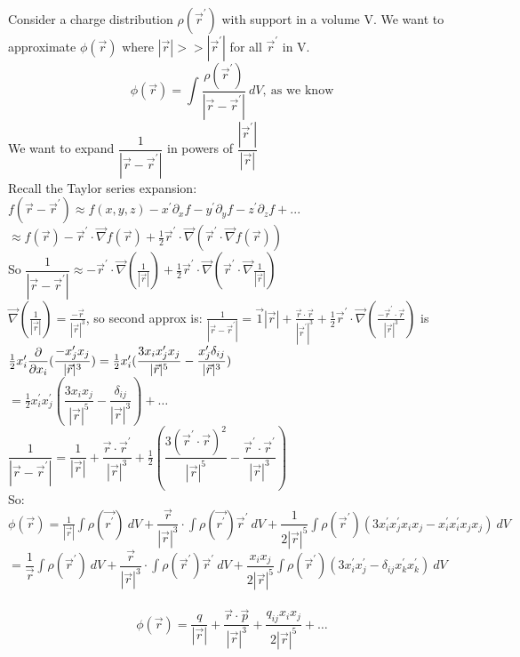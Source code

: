 Consider a charge distribution $\rho(\vec{r}^\prime)$ with support in a volume V. We want to approximate $\phi(\vec{r})$ where $|\vec{r}|>>|\vec{r}^\prime|$ for all $\vec{r}^\prime$ in V.
$$\phi(\vec{r})=\int \dfrac{\rho(\vec{r}^\prime)}{|\vec{r}-\vec{r}^\prime|}~dV,~\text{as we know}$$
We want to expand $\dfrac{1}{|\vec{r}-\vec{r}^\prime|}$ in powers of $\dfrac{|\vec{r}^\prime|}{|\vec{r}|}$\\
Recall the Taylor series expansion:\\
$f(\vec{r}-\vec{r}^\prime)\approx f(x,y,z)-x^\prime\partial_xf-y^\prime \partial_y f- z^\prime\partial_z f+...$\\
$\approx f(\vec{r}) -\vec{r}^\prime \cdot \vec{\nabla}f(\vec{r})+\frac{1}{2}\vec{r}^\prime \cdot \vec{\nabla}(\vec{r}^\prime \cdot \vec{\nabla} f(\vec{r}))$\\
So $\dfrac{1}{|\vec{r}-\vec{r}^\prime|} \approx -\vec{r}^\prime \cdot \vec{\nabla}(\frac{1}{|\vec{r}|}) + \frac{1}{2} \vec{r}^\prime \cdot \vec{\nabla}(\vec{r}^\prime\cdot \vec{\nabla}\frac{1}{|\vec{r}|})$\\
$\vec{\nabla}(\frac{1}{|\vec{r}|})=\frac{-\vec{r}}{|\vec{r}|^3}$, so second approx is:
$\frac{1}{|\vec{r}-\vec{r}^\prime|}=\vec{1}{|\vec{r}|}+\frac{\vec{r}\cdot\vec{r}}{|\vec{r}^\prime|^3}+\frac{1}{2}\vec{r}^\prime\cdot\vec{\nabla}(\frac{-\vec{r}^\prime \cdot \vec{r}}{|\vec{r}|^3})$ is \\
$\frac{1}{2} x^\prime _i \dfrac{\partial }{\partial x_i}(\dfrac{-x^\prime _j x_j}{|\vec{r}|^3})=\frac{1}{2} x^\prime _i (\dfrac{3x_i x_j ^\prime x_j}{|\vec{r}|^5} - \dfrac{x^\prime _j \delta_{ij}}{|\vec{r}|^3})$\\
$=\frac{1}{2}x^\prime _i x^\prime_j (\dfrac{3x_ix_j}{|\vec{r}|^5}-\dfrac{\delta_{ij}}{|\vec{r}|^3})+\ldots$\\
$\dfrac{1}{|\vec{r}-\vec{r}^\prime|}=\dfrac{1}{|\vec{r}|}+\dfrac{\vec{r}\cdot\vec{r}^\prime}{|\vec{r}|^3}+\frac{1}{2}(\dfrac{3(\vec{r}^\prime\cdot \vec{r})^2}{|\vec{r}|^5}-\dfrac{\vec{r}^\prime\cdot \vec{r}^\prime}{|\vec{r}|^3})$\\
So:\\
$\phi(\vec{r})=\frac{1}{|\vec{r}|}\int \rho(\vec{r^\prime})~dV +\dfrac{\vec{r}}{|\vec{r}|^3} \cdot\int \rho(\vec{r^\prime})\vec{r}^\prime ~dV + \dfrac{1}{2|\vec{r}|^5}\int \rho(\vec{r}^\prime)(3x_i ^\prime x_j ^\prime x_ix_j-x_i^\prime x_i ^\prime x_jx_j) ~dV$\\
$=\dfrac{1}{\vec{r}}\int \rho(\vec{r}^\prime)~dV+\dfrac{\vec{r}}{|\vec{r}|^3} \cdot\int \rho(\vec{r}^\prime) \vec{r}^\prime ~dV +\dfrac{x_i x_j}{2|\vec{r}|^5}\int \rho(\vec{r}^\prime)(3x_i ^\prime x_j ^\prime -\delta_{ij}x_k ^\prime x_k ^\prime)~dV$\\
\\
$$\phi(\vec{r})=\dfrac{q}{|\vec{r}|}+\dfrac{\vec{r}\cdot\vec{p}}{|\vec{r}|^3} + \dfrac{q_{ij}x_i x_j}{2|\vec{r}|^5}+\ldots$$\\